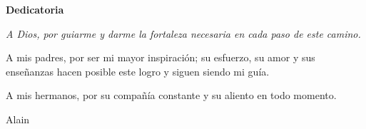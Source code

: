\clearpage
\thispagestyle{empty}

\vspace*{0.30\textheight}

{\hfill\Large\bfseries Dedicatoria\par}

\vspace{1.4cm}

\hfill
\begin{minipage}{0.68\textwidth}
  \itshape{}
  A Dios, por guiarme y darme la fortaleza necesaria en cada paso de este
  camino.

  A mis padres, por ser mi mayor inspiraci{\'o}n; su esfuerzo, su amor y sus
  ense{\~n}anzas hacen posible este logro y siguen siendo mi gu{\'i}a.

  A mis hermanos, por su compa{\~n}{\'i}a constante y su aliento en todo
  momento.\par

  \vspace{1.1cm}
  \normalfont\hfill Alain\par
\end{minipage}
\clearpage
